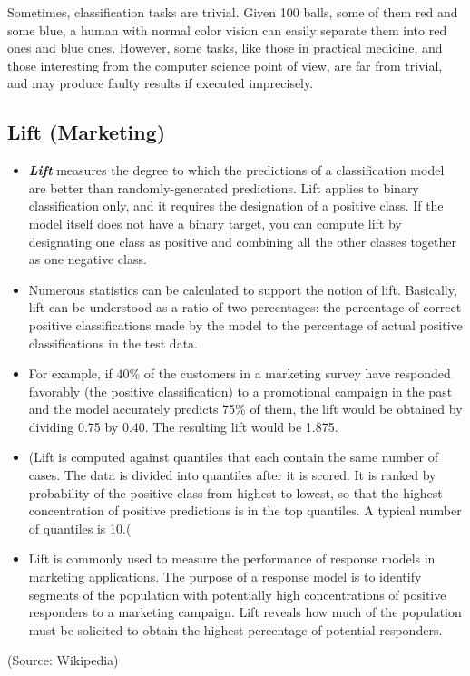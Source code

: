 Sometimes, classification tasks are trivial. Given 100 balls, some of them red and some blue, a human with normal color vision can easily separate them into red ones and blue ones. However, some tasks, like those in practical medicine, and those interesting from the computer science point of view, are far from trivial, and may produce faulty results if executed imprecisely.


\subsection{Lift (Marketing) }
\begin{itemize}
\item \textbf{\textit{Lift}} measures the degree to which the predictions of a classification model are better than randomly-generated predictions. Lift applies to binary classification only, and it requires the designation of a positive class. If the model itself does not have a binary target, you can compute lift by designating one class as positive and combining all the other classes together as one negative class.

\item Numerous statistics can be calculated to support the notion of lift. Basically, lift can be understood as a ratio of two percentages: the percentage of correct positive classifications made by the model to the percentage of actual positive classifications in the test data.

\item For example, if 40\% of the customers in a marketing survey have responded favorably (the positive classification) to a promotional campaign in the past and the model accurately predicts 75\% of them, the lift would be obtained by dividing 0.75 by 0.40. The resulting lift would be 1.875.

\item (Lift is computed against quantiles that each contain the same number of cases. The data is divided into quantiles after it is scored. It is ranked by probability of the positive class from highest to lowest, so that the highest concentration of positive predictions is in the top quantiles. A typical number of quantiles is 10.(

\item Lift is commonly used to measure the performance of response models in marketing applications. The purpose of a response model is to identify segments of the population with potentially high concentrations of positive responders to a marketing campaign. Lift reveals how much of the population must be solicited to obtain the highest percentage of potential responders.

\end{itemize}
(Source: Wikipedia)

